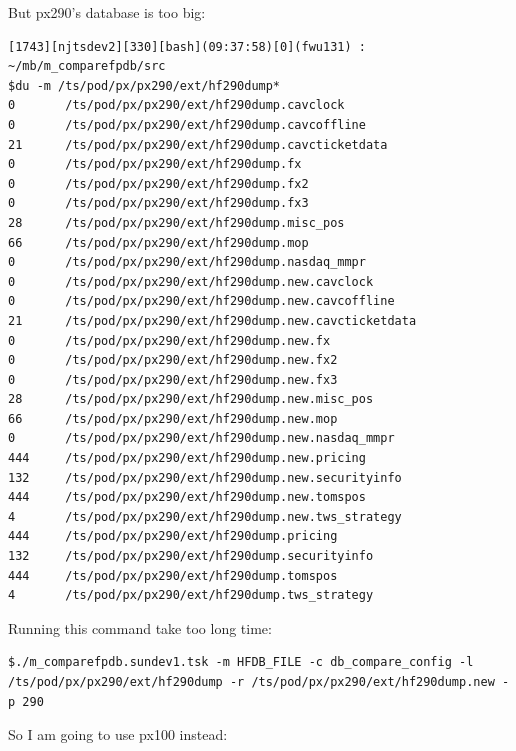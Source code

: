\documentclass[8pt,]{article}
\begin{document}
But px290's database is too big:

\begin{verbatim}
[1743][njtsdev2][330][bash](09:37:58)[0](fwu131) : ~/mb/m_comparefpdb/src
$du -m /ts/pod/px/px290/ext/hf290dump*
0       /ts/pod/px/px290/ext/hf290dump.cavclock
0       /ts/pod/px/px290/ext/hf290dump.cavcoffline
21      /ts/pod/px/px290/ext/hf290dump.cavcticketdata
0       /ts/pod/px/px290/ext/hf290dump.fx
0       /ts/pod/px/px290/ext/hf290dump.fx2
0       /ts/pod/px/px290/ext/hf290dump.fx3
28      /ts/pod/px/px290/ext/hf290dump.misc_pos
66      /ts/pod/px/px290/ext/hf290dump.mop
0       /ts/pod/px/px290/ext/hf290dump.nasdaq_mmpr
0       /ts/pod/px/px290/ext/hf290dump.new.cavclock
0       /ts/pod/px/px290/ext/hf290dump.new.cavcoffline
21      /ts/pod/px/px290/ext/hf290dump.new.cavcticketdata
0       /ts/pod/px/px290/ext/hf290dump.new.fx
0       /ts/pod/px/px290/ext/hf290dump.new.fx2
0       /ts/pod/px/px290/ext/hf290dump.new.fx3
28      /ts/pod/px/px290/ext/hf290dump.new.misc_pos
66      /ts/pod/px/px290/ext/hf290dump.new.mop
0       /ts/pod/px/px290/ext/hf290dump.new.nasdaq_mmpr
444     /ts/pod/px/px290/ext/hf290dump.new.pricing
132     /ts/pod/px/px290/ext/hf290dump.new.securityinfo
444     /ts/pod/px/px290/ext/hf290dump.new.tomspos
4       /ts/pod/px/px290/ext/hf290dump.new.tws_strategy
444     /ts/pod/px/px290/ext/hf290dump.pricing
132     /ts/pod/px/px290/ext/hf290dump.securityinfo
444     /ts/pod/px/px290/ext/hf290dump.tomspos
4       /ts/pod/px/px290/ext/hf290dump.tws_strategy
\end{verbatim}

Running this command take too long time:

\begin{verbatim}
$./m_comparefpdb.sundev1.tsk -m HFDB_FILE -c db_compare_config -l /ts/pod/px/px290/ext/hf290dump -r /ts/pod/px/px290/ext/hf290dump.new -p 290
\end{verbatim}

So I am going to use px100 instead:
\end{document}
